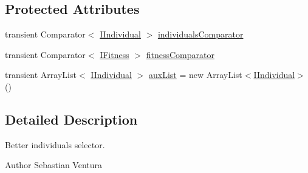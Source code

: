 \subsection*{Protected Attributes}
\begin{DoxyCompactItemize}
\item 
transient Comparator$<$ \hyperlink{interfacenet_1_1sf_1_1jclec_1_1_i_individual}{I\-Individual} $>$ \hyperlink{classnet_1_1sf_1_1jclec_1_1selector_1_1_worses_selector_a0a02abaad7e94b3c69d0d357616563cc}{individuals\-Comparator}
\item 
transient Comparator$<$ \hyperlink{interfacenet_1_1sf_1_1jclec_1_1_i_fitness}{I\-Fitness} $>$ \hyperlink{classnet_1_1sf_1_1jclec_1_1selector_1_1_worses_selector_ad616da9c10e71aa53acc28300fc0c18e}{fitness\-Comparator}
\item 
transient Array\-List$<$ \hyperlink{interfacenet_1_1sf_1_1jclec_1_1_i_individual}{I\-Individual} $>$ \hyperlink{classnet_1_1sf_1_1jclec_1_1selector_1_1_worses_selector_ac94a7bc035ca4471e05c24acdad462e5}{aux\-List} = new Array\-List$<$\hyperlink{interfacenet_1_1sf_1_1jclec_1_1_i_individual}{I\-Individual}$>$ ()
\end{DoxyCompactItemize}


\subsection{Detailed Description}
Better individuals selector.

\begin{DoxyAuthor}{Author}
Sebastian Ventura 
\end{DoxyAuthor}


